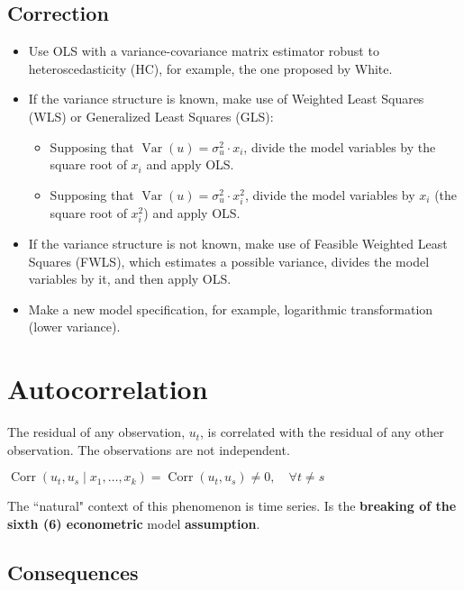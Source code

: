 \documentclass[10pt, a4paper, landscape]{article}
\DeclareMathOperator{\Var}{Var}
\DeclareMathOperator{\Corr}{Corr}
\begin{document}
\begin{multicols}{3}
\subsection*{Correction}

\begin{itemize}[leftmargin=*]
	\item Use OLS with a variance-covariance matrix estimator robust to heteroscedasticity (HC), for example, the one proposed by White.
	\item If the variance structure is known, make use of Weighted Least Squares (WLS) or Generalized Least Squares (GLS):
	\begin{itemize}[leftmargin=*]
		\item Supposing that \( \Var(u) = \sigma_{u}^{2} \cdot x_{i} \), divide the model variables by the square root of \( x_{i} \) and apply OLS.
		\item Supposing that \( \Var(u) = \sigma_{u}^{2} \cdot x_{i}^{2} \), divide the model variables by \( x_{i} \) (the square root of \( x_{i}^{2} \)) and apply OLS.
	\end{itemize}
	\item If the variance structure is not known, make use of Feasible Weighted Least Squares (FWLS), which estimates a possible variance, divides the model variables by it, and then apply OLS.
	\item Make a new model specification, for example, logarithmic transformation (lower variance).
\end{itemize}

\columnbreak

\section*{Autocorrelation}

The residual of any observation, \( u_{t} \), is correlated with the residual of any other observation. The observations are not independent.

\begin{center}
	\( \Corr(u_{t}, u_{s} \mid x_{1}, \ldots, x_{k}) = \Corr(u_{t}, u_{s}) \neq 0, \quad \forall t \neq s \)
\end{center}

The ``natural" context of this phenomenon is time series. Is the \textbf{breaking of the sixth (6) econometric} model \textbf{assumption}.

\subsection*{Consequences}


\end{multicols}
\end{document}
